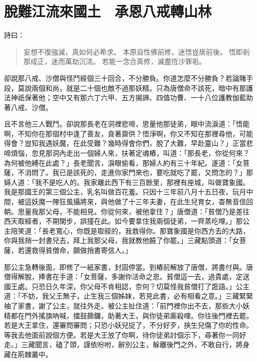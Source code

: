
\chapter{脫難江流來國土　承恩八戒轉山林}

詩曰：
\begin{quote}
妄想不復強滅，真如何必希求。
本原自性佛前修，迷悟豈居前後。
悟即剎那成正，迷而萬劫沉流。
若能一念合真修，滅盡恆沙罪垢。
\end{quote}

卻說那八戒、沙僧與怪鬥經個三十回合，不分勝負。你道怎麼不分勝負？若論賭手段，莫說兩個和尚，就是二十個也敵不過那妖精。只為唐僧命不該死，暗中有那護法神祇保著他；空中又有那六丁六甲、五方揭諦、四值功曹、一十八位護教伽藍助著八戒、沙僧。

且不言他三人戰鬥。卻說那長老在洞裡悲啼，思量他那徒弟，眼中流淚道：「悟能啊，不知你在那個村中逢了善友，貪著齋供？悟淨啊，你又不知在那裡尋他，可能得會？豈知我遇妖魔，在此受難？幾時得會你們，脫了大難，早赴靈山？」正當悲啼煩惱，忽見那洞內走出一個婦人來，扶著定魂樁，叫道：「那長老，你從何來？為何被他縛在此處？」長老聞言，淚眼偷看，那婦人約有三十年紀。遂道：「女菩薩，不消問了。我已是該死的，走進你家門來也，要吃就吃了罷，又問怎的？」那婦人道：「我不是吃人的。我家離此西下有三百餘里，那裡有座城，叫做寶象國。我是那國王的第三個公主，乳名叫做百花羞。只因十三年前八月十五日夜，玩月中間，被這妖魔一陣狂風攝將來，與他做了十三年夫妻，在此生兒育女，杳無音信回朝。思量我那父母，不能相見。你從何來，被他拿住？」唐僧道：「貧僧乃是差往西天取經者，不期閑步，誤撞在此。如今要拿住我兩個徒弟，一齊蒸吃哩。」那公主陪笑道：「長老寬心，你既是取經的，我救得你。那寶象國是你西方去的大路，你與我捎一封書兒去，拜上我那父母，我就教他饒了你罷。」三藏點頭道：「女菩薩，若還救得貧僧命，願做捎書寄信人。」

那公主急轉後面，即修了一紙家書，封固停當。到樁前解放了唐僧，將書付與。唐僧得解脫，捧書在手道：「女菩薩，多謝你活命之恩。貧僧這一去，過貴處，定送國王處。只恐日久年深，你父母不肯相認，奈何？切莫怪我貧僧打了誑語。」公主道：「不妨，我父王無子，止生我三個姊妹，若見此書，必有相看之意。」三藏緊緊袖了家書，謝了公主，就往外走。被公主扯住道：「前門裡你出不去，那些大小妖精都在門外搖旗吶喊，擂鼓篩鑼，助著大王，與你徒弟廝殺哩。你往後門裡去罷。若是大王拿住，還審問審問；只恐小妖兒捉了，不分好歹，挾生兒傷了你的性命。等我去他面前說個方便。若是大王放了你啊，待你徒弟討個示下，尋著你一同好走。」三藏聞言，磕了頭，謹依吩咐，辭別公主，躲離後門之外，不敢自行，將身藏在荊棘叢中。

